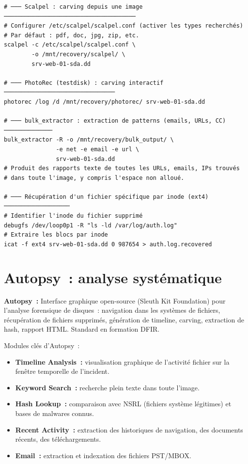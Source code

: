 \begin{lstlisting}[style=StyleTerminal,
  caption={Récupération de fichiers avec Scalpel et PhotoRec},
  label={lst:file-carving}]
# ─── Scalpel : carving depuis une image ──────────────────────────────────────
# Configurer /etc/scalpel/scalpel.conf (activer les types recherchés)
# Par défaut : pdf, doc, jpg, zip, etc.
scalpel -c /etc/scalpel/scalpel.conf \
        -o /mnt/recovery/scalpel/ \
        srv-web-01-sda.dd

# ─── PhotoRec (testdisk) : carving interactif ────────────────────────────────
photorec /log /d /mnt/recovery/photorec/ srv-web-01-sda.dd

# ─── bulk_extractor : extraction de patterns (emails, URLs, CC) ──────────────
bulk_extractor -R -o /mnt/recovery/bulk_output/ \
               -e net -e email -e url \
               srv-web-01-sda.dd
# Produit des rapports texte de toutes les URLs, emails, IPs trouvés
# dans toute l'image, y compris l'espace non alloué.

# ─── Récupération d'un fichier spécifique par inode (ext4) ───────────────────
# Identifier l'inode du fichier supprimé
debugfs /dev/loop0p1 -R "ls -ld /var/log/auth.log"
# Extraire les blocs par inode
icat -f ext4 srv-web-01-sda.dd 0 987654 > auth.log.recovered
\end{lstlisting}

\section{Autopsy~: analyse systématique}
\label{sec:autopsy}

\begin{boxdef}
\textbf{Autopsy~:} Interface graphique open-source (Sleuth Kit Foundation)
pour l'analyse forensique de disques~: navigation dans les systèmes de
fichiers, récupération de fichiers supprimés, génération de timeline,
carving, extraction de hash, rapport HTML. Standard en formation DFIR.
\end{boxdef}

Modules clés d'Autopsy~:
\begin{itemize}
  \item \textbf{Timeline Analysis~:} visualisation graphique de l'activité
        fichier sur la fenêtre temporelle de l'incident.
  \item \textbf{Keyword Search~:} recherche plein texte dans toute l'image.
  \item \textbf{Hash Lookup~:} comparaison avec NSRL (fichiers système
        légitimes) et bases de malwares connus.
  \item \textbf{Recent Activity~:} extraction des historiques de navigation,
        des documents récents, des téléchargements.
  \item \textbf{Email~:} extraction et indexation des fichiers PST/MBOX.
\end{itemize}

